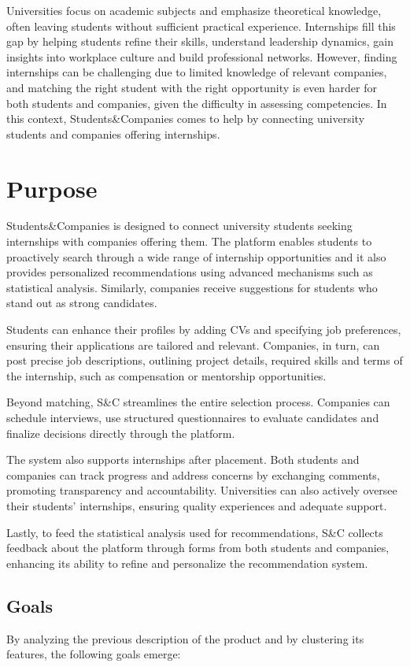 Universities focus on academic subjects and emphasize theoretical knowledge, often leaving students without sufficient practical experience.
Internships fill this gap by helping students refine their skills, understand leadership dynamics, gain insights into workplace culture and build professional networks.
However, finding internships can be challenging due to limited knowledge of relevant companies, and matching the right student with the right opportunity is even harder for both students and companies, given the difficulty in assessing competencies.
In this context, Students\&Companies comes to help by connecting university students and companies offering internships.

\section{Purpose}
Students\&Companies is designed to connect university students seeking internships with companies offering them.
The platform enables students to proactively search through a wide range of internship opportunities and it also provides personalized recommendations using advanced mechanisms such as statistical analysis.
Similarly, companies receive suggestions for students who stand out as strong candidates.

Students can enhance their profiles by adding CVs and specifying job preferences, ensuring their applications are tailored and relevant.
Companies, in turn, can post precise job descriptions, outlining project details, required skills and terms of the internship, such as compensation or mentorship opportunities.

Beyond matching, S\&C streamlines the entire selection process.
Companies can schedule interviews, use structured questionnaires to evaluate candidates and finalize decisions directly through the platform. 

The system also supports internships after placement.
Both students and companies can track progress and address concerns by exchanging comments, promoting transparency and accountability.
Universities can also actively oversee their students' internships, ensuring quality experiences and adequate support.

Lastly, to feed the statistical analysis used for recommendations, S\&C collects feedback about the platform through forms from both students and companies, enhancing its ability to refine and personalize the recommendation system.

\subsection{Goals}
By analyzing the previous description of the product and by clustering its features, the following goals emerge:

